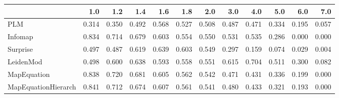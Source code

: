 \begin{tabular}{lrrrrrrrrrrr}
\toprule
{} &   1.0 &   1.2 &   1.4 &   1.6 &   1.8 &   2.0 &   3.0 &   4.0 &   5.0 &   6.0 &   7.0 \\
\midrule
PLM                 & 0.314 & 0.350 & 0.492 & 0.568 & 0.527 & 0.508 & 0.487 & 0.471 & 0.334 & 0.195 & 0.057 \\
Infomap             & 0.834 & 0.714 & 0.679 & 0.603 & 0.554 & 0.550 & 0.531 & 0.535 & 0.286 & 0.000 & 0.000 \\
Surprise            & 0.497 & 0.487 & 0.619 & 0.639 & 0.603 & 0.549 & 0.297 & 0.159 & 0.074 & 0.029 & 0.004 \\
LeidenMod           & 0.498 & 0.600 & 0.638 & 0.593 & 0.558 & 0.551 & 0.615 & 0.704 & 0.511 & 0.300 & 0.082 \\
MapEquation         & 0.838 & 0.720 & 0.681 & 0.605 & 0.562 & 0.542 & 0.471 & 0.431 & 0.336 & 0.199 & 0.000 \\
MapEquationHierarch & 0.841 & 0.712 & 0.674 & 0.607 & 0.561 & 0.541 & 0.480 & 0.433 & 0.321 & 0.193 & 0.000 \\
\bottomrule
\end{tabular}
